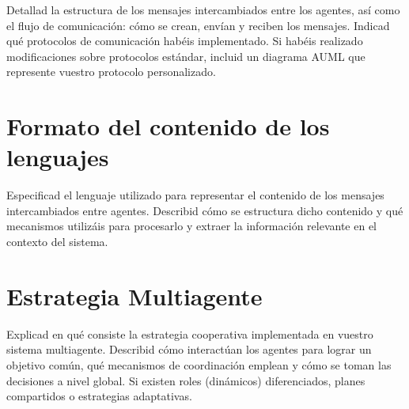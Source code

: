 \documentclass[a4paper,12pt]{article}
\begin{document}
Detallad la estructura de los mensajes intercambiados entre los agentes, así como el flujo de comunicación: cómo se crean, envían y reciben los mensajes. Indicad qué protocolos de comunicación habéis implementado. Si habéis realizado modificaciones sobre protocolos estándar, incluid un diagrama AUML que represente vuestro protocolo personalizado.

\section*{\large Formato del contenido de los lenguajes}

Especificad el lenguaje utilizado para representar el contenido de los mensajes intercambiados entre agentes. Describid cómo se estructura dicho contenido y qué mecanismos utilizáis para procesarlo y extraer la información relevante en el contexto del sistema.

\section*{\large Estrategia Multiagente}

Explicad en qué consiste la estrategia cooperativa implementada en vuestro sistema multiagente. Describid cómo interactúan los agentes para lograr un objetivo común, qué mecanismos de coordinación emplean y cómo se toman las decisiones a nivel global. Si existen roles (dinámicos) diferenciados, planes compartidos o estrategias adaptativas.
\end{document}
